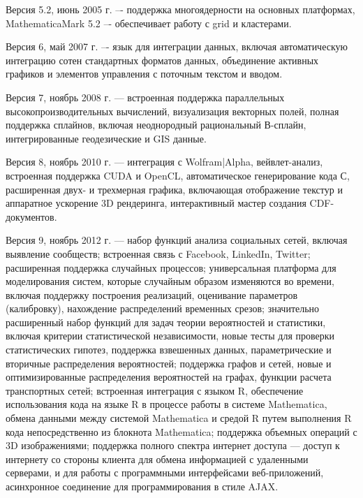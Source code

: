 \begin{textitemize}
	\item Версия 5.2, июнь 2005 г. –- поддержка многоядерности на основных платформах, MathematicaMark 5.2 –- обеспечивает работу с grid и кластерами.
	\item Версия 6, май 2007 г. –- язык для интеграции данных, включая автоматическую интеграцию сотен стандартных форматов данных, объединение активных графиков и элементов управления с поточным текстом и вводом.
	\item Версия 7, ноябрь 2008 г. --- встроенная поддержка параллельных высокопроизводительных вычислений, визуализация векторных полей, полная поддержка сплайнов, включая неоднородный рациональный В-сплайн, интегрированные геодезические и GIS данные.
	\item Версия 8, ноябрь 2010 г. --- интеграция с Wolfram|Alpha, вейвлет-анализ, встроенная поддержка CUDA и OpenCL, автоматическое генерирование кода С, расширенная двух- и трехмерная графика, включающая отображение текстур и аппаратное ускорение 3D рендеринга, интерактивный мастер создания CDF-документов.
	\item Версия 9, ноябрь 2012 г. --- набор функций анализа социальных сетей, включая выявление сообществ; встроенная связь с Facebook, LinkedIn, Twitter; расширенная поддержка случайных процессов; универсальная платформа для моделирования систем, которые случайным образом изменяются во времени, включая поддержку построения реализаций, оценивание параметров (калибровку), нахождение распределений временных срезов; значительно расширенный набор функций для задач теории вероятностей и статистики, включая критерии статистической независимости, новые тесты для проверки статистических гипотез, поддержка взвешенных данных, параметрические и вторичные распределения вероятностей; поддержка графов и сетей, новые и оптимизированные распределения вероятностей на графах, функции расчета транспортных сетей; встроенная интеграция с языком R, обеспечение использования кода на языке R в процессе работы в системе Mathematica, обмена данными между системой Mathematica и средой R путем выполнения R кода непосредственно из блокнота Mathematica; поддержка объемных операций с 3D изображениями; поддержка полного спектра интернет доступа --- доступ к интернету со стороны клиента для обмена информацией с удаленными серверами, и для работы с программными интерфейсами веб-приложений, асинхронное соединение для программирования в стиле AJAX.

\end{textitemize}
